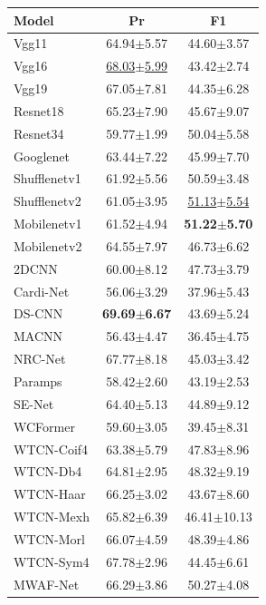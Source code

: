 \begin{minipage}[t]{0.50\linewidth}\vspace{0pt}\centering
\captionsetup{type=table}
\centering\color{black}
\caption{Additional CirCor Outcome precision and F1-score. Abnormal is the positive class.}\label{tab:circor_binary_segment}
\begingroup
\fontsize{8.5}{10.2}\selectfont
\setlength{\tabcolsep}{2pt}\renewcommand{\arraystretch}{1.01}
\begin{tabular*}{\linewidth}{@{\extracolsep{\fill}}lcc@{}}\toprule
\textbf{Model} & \textbf{Pr} & \textbf{F1}\\\midrule
Vgg11 & 64.94$\pm$5.57 & 44.60$\pm$3.57\\
Vgg16 & \underline{68.03$\pm$5.99} & 43.42$\pm$2.74\\
Vgg19 & 67.05$\pm$7.81 & 44.35$\pm$6.28\\
Resnet18 & 65.23$\pm$7.90 & 45.67$\pm$9.07\\
Resnet34 & 59.77$\pm$1.99 & 50.04$\pm$5.58\\
Googlenet & 63.44$\pm$7.22 & 45.99$\pm$7.70\\
\midrule
Shufflenetv1 & 61.92$\pm$5.56 & 50.59$\pm$3.48\\
Shufflenetv2 & 61.05$\pm$3.95 & \underline{51.13$\pm$5.54}\\
Mobilenetv1 & 61.52$\pm$4.94 & \textbf{51.22$\pm$5.70}\\
Mobilenetv2 & 64.55$\pm$7.97 & 46.73$\pm$6.62\\
\midrule
2DCNN~\cite{2DCNN} & 60.00$\pm$8.12 & 47.73$\pm$3.79\\
Cardi-Net~\cite{Cardi-Net} & 56.06$\pm$3.29 & 37.96$\pm$5.43\\
DS-CNN~\cite{DS-CNN} & \textbf{69.69$\pm$6.67} & 43.69$\pm$5.24\\
MACNN~\cite{chen2021multi} & 56.43$\pm$4.47 & 36.45$\pm$4.75\\
NRC-Net~\cite{NRC-Net} & 67.77$\pm$8.18 & 45.03$\pm$3.42\\
Paramps~\cite{Paramps} & 58.42$\pm$2.60 & 43.19$\pm$2.53\\
SE-Net~\cite{SE-Net} & 64.40$\pm$5.13 & 44.89$\pm$9.12\\
WCFormer~\cite{WCFormer} & 59.60$\pm$3.05 & 39.45$\pm$8.31\\
\midrule
WTCN-Coif4 & 63.38$\pm$5.79 & 47.83$\pm$8.96\\
WTCN-Db4 & 64.81$\pm$2.95 & 48.32$\pm$9.19\\
WTCN-Haar & 66.25$\pm$3.02 & 43.67$\pm$8.60\\
WTCN-Mexh & 65.82$\pm$6.39 & 46.41$\pm$10.13\\
WTCN-Morl & 66.07$\pm$4.59 & 48.39$\pm$4.86\\
WTCN-Sym4 & 67.78$\pm$2.96 & 44.45$\pm$6.61\\
\midrule
MWAF-Net & 66.29$\pm$3.86 & 50.27$\pm$4.08\\
\bottomrule\end{tabular*}
\endgroup
{}

\end{minipage}